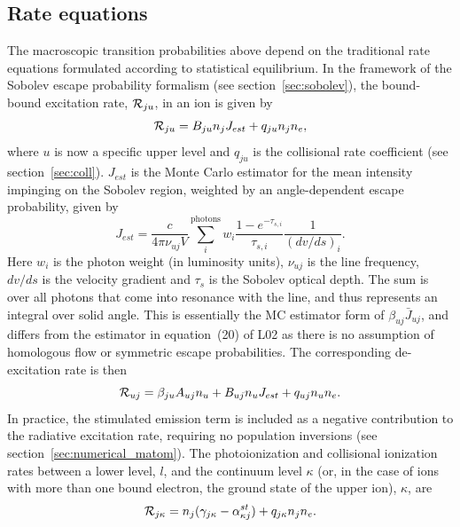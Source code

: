 \subsection{Rate equations}
\label{sec:rate_eq}
The macroscopic transition probabilities above depend on the traditional
rate equations formulated according to statistical equilibrium. 
In the framework of the Sobolev escape probability formalism 
(see section~\ref{sec:sobolev}), 
the bound-bound excitation rate, ${\cal R}_{ju}$, in an ion is given by 
\begin{equation}
{\cal R}_{ju} = B_{ju} n_j J_{est} + q_{ju} n_j n_e,
\label{eq:rad_rate}
\end{equation}
where $u$ is now a specific upper level and $q_{ju}$ is the collisional
rate coefficient (see section~\ref{sec:coll}).
$J_{est}$ is the Monte Carlo estimator for the mean intensity 
impinging on the Sobolev region, weighted by an angle-dependent escape probability, 
given by \citep{sim2004}
\begin{equation}
J_{est} = \frac{c}{4 \pi \nu_{uj} V} \sum_{i}^{\mathrm{photons}} w_i \frac{1 - e^{-\tau_{s,i}}}{\tau_{s,i}} \frac{1}{(dv/ds)_i}.
\end{equation}
Here $w_i$ is the photon weight (in luminosity units), $\nu_{uj}$
is the line frequency, $dv/ds$ is the velocity gradient and
$\tau_s$ is the Sobolev optical depth.
The sum is over all photons that come into resonance with the line,
and thus represents an integral over solid angle.
This is essentially the MC estimator form of $\beta_{uj}\bar{J}_{uj}$, and differs
from the estimator in equation~(20) of L02 as 
there is no assumption of homologous flow or symmetric escape probabilities.
The corresponding de-excitation rate is then 
\begin{equation}
{\cal R}_{uj} = \beta_{ju} A_{uj} n_u + B_{uj} n_u J_{est} +
q_{uj} n_u n_e.
\label{eq:nlte_rul}
\end{equation}
In practice, the stimulated emission term is included as a negative contribution
to the radiative excitation rate, requiring no population inversions 
(see section~\ref{sec:numerical_matom}).
The photoionization and collisional ionization rates
between a lower level, $l$, and the continuum level $\kappa$ 
(or, in the case of ions with more than one bound electron, 
the ground state of the upper ion),
$\kappa$, are
\begin{equation}
{\cal R}_{j \kappa}= n_j (\gamma_{j\kappa} - \alpha^{st}_{\kappa j})  + q_{j \kappa} n_j n_e.
\end{equation}
